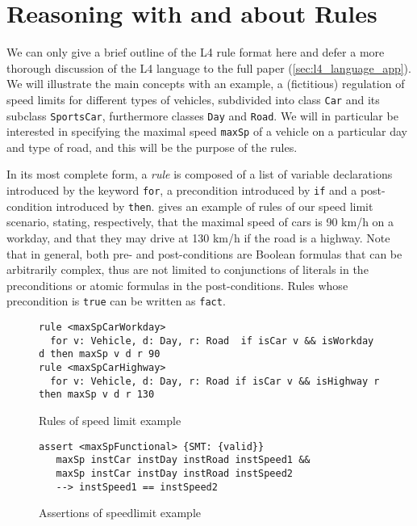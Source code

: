 \section{Reasoning with and about Rules}\label{sec:resasoning_with_rules}

We can only give a brief outline of the L4 rule format here and defer a more
thorough discussion of the L4 language to the full paper (\ref{sec:l4_language_app}).
We will illustrate the main concepts with an example, a (fictitious) regulation of speed
limits for different types of vehicles, subdivided into class \texttt{Car}
and its subclass \texttt{SportsCar}, furthermore classes \texttt{Day} and \texttt{Road}. We will
in particular be interested in specifying the maximal speed \texttt{maxSp} of
a vehicle on a particular day and type of road, and this will be the purpose
of the rules.

In its most complete form, a \emph{rule} is composed of a list of variable
declarations introduced by the keyword \texttt{for}, a precondition introduced
by \texttt{if} and a post-condition introduced by
\texttt{then}.  gives an example of rules of our speed limit
scenario, stating, respectively, that the maximal speed of cars is 90 km/h on a
workday,
and that they may drive at 130 km/h if the road is a highway.  Note that in
general, both pre- and post-conditions are Boolean formulas that can be
arbitrarily complex, thus are not limited to conjunctions of literals in the
preconditions or atomic formulas in the post-conditions.
Rules whose precondition is \texttt{true} can be written as \texttt{fact}.

\begin{figure}[h!]
  \begin{lstlisting}
rule <maxSpCarWorkday> 
  for v: Vehicle, d: Day, r: Road  if isCar v && isWorkday d then maxSp v d r 90
rule <maxSpCarHighway>
  for v: Vehicle, d: Day, r: Road if isCar v && isHighway r then maxSp v d r 130
\end{lstlisting}
  \caption{Rules of speed limit example}\label{fig:rules}
\end{figure}

\begin{figure}[h]
\begin{lstlisting}
assert <maxSpFunctional> {SMT: {valid}}
   maxSp instCar instDay instRoad instSpeed1 &&
   maxSp instCar instDay instRoad instSpeed2
   --> instSpeed1 == instSpeed2
\end{lstlisting}
  \caption{Assertions of speedlimit example}\label{fig:assertions}
\end{figure}



